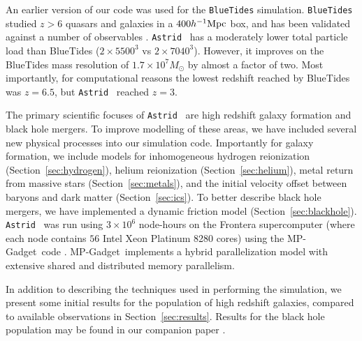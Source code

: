 \documentclass[fleqn,usenatbib]{mnras}
\newcommand{\software}[1]{{\small #1}}
\newcommand{\mpgadget}{\software{MP-Gadget}}
\def\astrid{\texttt{Astrid} }
\def\bluetides{\texttt{BlueTides} }
\def\hmpc{h^{-1}{\rm Mpc}}
\begin{document}
An earlier version of our code was used for the \bluetides simulation. \bluetides studied $z>6$ quasars and galaxies in a $400 \hmpc$ box, and has been validated against a number of observables \citep[e.g.][]{Feng:2016,Wilkins2017,DiMatteo2017,Tenneti2018,Huang2018,Ni2018,Bhowmick2018,Ni2020,Marshall2020,Marshall2021}.
\astrid~has a moderately lower total particle load than BlueTides ($2\times 5500^3$ vs $2 \times 7040^3$). However, it improves on the BlueTides mass resolution of $1.7 \times 10^7 M_\odot$ by almost a factor of two. Most importantly, for computational reasons the lowest redshift reached by BlueTides was $z=6.5$, but \astrid~reached $z=3$.

The primary scientific focuses of \astrid~are high redshift galaxy formation and black hole mergers. To improve modelling of these areas, we have included several new physical processes into our simulation code. Importantly for galaxy formation, we include models for inhomogeneous hydrogen reionization (Section~\ref{sec:hydrogen}), helium reionization (Section~\ref{sec:helium}), metal return from massive stars (Section~\ref{sec:metals}), and the initial velocity offset between baryons and dark matter (Section~\ref{sec:ics}). To better describe black hole mergers, we have implemented a dynamic friction model (Section~\ref{sec:blackhole}). \astrid~was run using $3\times 10^6$ node-hours on the Frontera supercomputer (where each node contains $56$ Intel Xeon Platinum 8280 cores) using the \mpgadget~code \citep{MPGadget2018}. \mpgadget~implements a hybrid parallelization model with extensive shared and distributed memory parallelism.

In addition to describing the techniques used in performing the simulation, we present some initial results for the population of high redshift galaxies, compared to available observations in Section~\ref{sec:results}. Results for the black hole population may be found in our companion paper \citep{Ni:2021inprep}.
\end{document}
